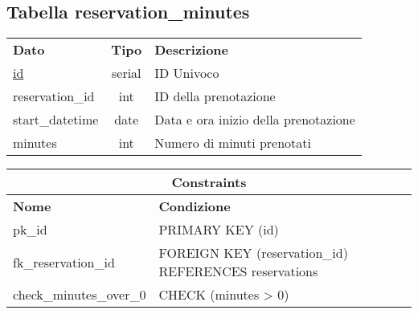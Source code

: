 \begin{center}
    \subsection*{Tabella \textnormal{reservation\_minutes}}
    
    \begin{tabularx}{\textwidth}{l c X}
        \toprule
        \textbf{Dato} & \textbf{Tipo} & \textbf{Descrizione}\\
        \underline{id} & serial & ID Univoco \\
        reservation\_id & int & ID della prenotazione\\
        start\_datetime & date & Data e ora inizio della prenotazione\\
        minutes & int & Numero di minuti prenotati\\
        \midrule
    \end{tabularx}
    \begin{tabularx}{\textwidth}{l X}
        \multicolumn{2}{c}{\textbf{Constraints}}\\
        \midrule
        \textbf{Nome} & \textbf{Condizione}\\
        pk\_id & PRIMARY KEY (id)\\
        fk\_reservation\_id & FOREIGN KEY (reservation\_id) REFERENCES reservations\\
        check\_minutes\_over\_0 & CHECK (minutes > 0)\\
        \bottomrule
    \end{tabularx}
    \bigskip
\end{center}

